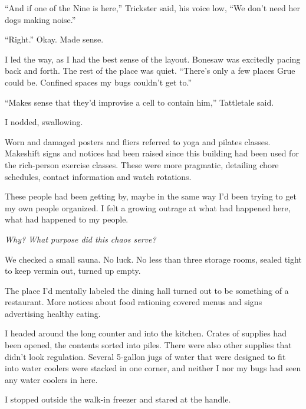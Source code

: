 ``And if one of the Nine is here,'' Trickster said, his voice low, ``We don't need her dogs making noise.''



``Right.''  Okay.  Made sense.



I led the way, as I had the best sense of the layout.  Bonesaw was excitedly pacing back and forth.  The rest of the place was quiet.  ``There's only a few places Grue could be.  Confined spaces my bugs couldn't get to.''



``Makes sense that they'd improvise a cell to contain him,'' Tattletale said.



I nodded, swallowing.



Worn and damaged posters and fliers referred to yoga and pilates classes.  Makeshift signs and notices had been raised since this building had been used for the rich-person exercise classes.  These were more pragmatic, detailing chore schedules, contact information and watch rotations.



These people had been getting by, maybe in the same way I'd been trying to get my own people organized.  I felt a growing outrage at what had happened here, what had happened to my people.



\emph{Why?  What purpose did this chaos serve?}



We checked a small sauna.  No luck.  No less than three storage rooms, sealed tight to keep vermin out, turned up empty.



The place I'd mentally labeled the dining hall turned out to be something of a restaurant.  More notices about food rationing covered menus and signs advertising healthy eating.



I headed around the long counter and into the kitchen.  Crates of supplies had been opened, the contents sorted into piles.  There were also other supplies that didn't look regulation.  Several 5-gallon jugs of water that were designed to fit into water coolers were stacked in one corner, and neither I nor my bugs had seen any water coolers in here.



I stopped outside the walk-in freezer and stared at the handle.



